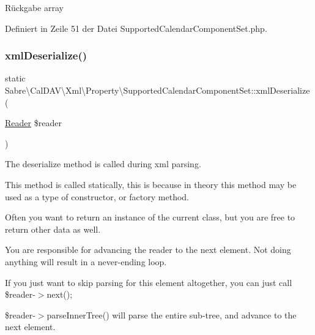\begin{DoxyReturn}{Rückgabe}
array 
\end{DoxyReturn}


Definiert in Zeile 51 der Datei Supported\+Calendar\+Component\+Set.\+php.

\mbox{\label{class_sabre_1_1_cal_d_a_v_1_1_xml_1_1_property_1_1_supported_calendar_component_set_ab58cc0ee52dfd4bbf94716ec2deb2e74}} 
\subsubsection{\texorpdfstring{xml\+Deserialize()}{xmlDeserialize()}}
{\footnotesize\ttfamily static Sabre\textbackslash{}\+Cal\+D\+A\+V\textbackslash{}\+Xml\textbackslash{}\+Property\textbackslash{}\+Supported\+Calendar\+Component\+Set\+::xml\+Deserialize (\begin{DoxyParamCaption}\item[{\mbox{\hyperlink{class_sabre_1_1_xml_1_1_reader}{Reader}}}]{\$reader }\end{DoxyParamCaption})\hspace{0.3cm}{\ttfamily [static]}}

The deserialize method is called during xml parsing.

This method is called statically, this is because in theory this method may be used as a type of constructor, or factory method.

Often you want to return an instance of the current class, but you are free to return other data as well.

You are responsible for advancing the reader to the next element. Not doing anything will result in a never-\/ending loop.

If you just want to skip parsing for this element altogether, you can just call \$reader-\/$>$next();

\$reader-\/$>$parse\+Inner\+Tree() will parse the entire sub-\/tree, and advance to the next element.


